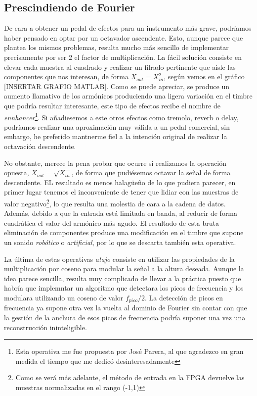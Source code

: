 \subsection{Prescindiendo de Fourier}
De cara a obtener un pedal de efectos para un instrumento más grave, podríamos haber pensado en optar por un octavador ascendente. Esto, aunque parece que plantea los mismos problemas, resulta mucho más sencillo de implementar precisamente por ser 2 el factor de multiplicación. La fácil solución consiste en elevar cada muestra al cuadrado y realizar un filrado pertinente que aisle las componentes que nos interesan, de forma $X_{out} = X_{in}^{2}$, según vemos en el gráfico [INSERTAR GRAFIO MATLAB]. Como se puede apreciar, se produce un aumento llamativo de los armónicos produciendo una ligera variación en el timbre que podría resultar interesante, este tipo de efectos recibe el nombre de \emph{ennhancer}\footnote{Esta operativa me fue propuesta por José Parera, al que agradezco en gran medida el tiempo que me dedicó desinteresadamente}. Si añadiesemos a este otros efectos como tremolo, reverb o delay, podríamos realizar una aproximación muy válida a un pedal comercial, sin embargo, he preferido mantnerme fiel a la intención original de realizar la octavación descendente.

No obstante, merece la pena probar que ocurre si realizamos la operación opuesta, $X_{out} = \sqrt{X_{in}}$, de forma que pudiésemos octavar la señal de forma descendente. EL resultado es menos halagüeño de lo que pudiera parecer, en primer lugar tenemos el inconveniente de tener que lidiar con las muestras de valor negativo\footnote{Como se verá más adelante, el método de entrada en la FPGA devuelve las muestras normalizadas en el rango (-1,1)}, lo que resulta una molestia de cara a la cadena de datos. Además, debido a que la entrada está limitada en banda, al reducir de forma cuadrática el valor del armónico más agudo. El resultado de esta bruta eliminación de componentes produce una modificación en el timbre que supone un sonido \emph{robótico} o \emph{artificial}, por lo que se descarta también esta operativa.

La última de estas operativas \emph{atajo} consiste en utilizar las propiedades de la multiplicación por coseno para modular la señal a la altura deseada. Aunque la idea parece sencilla, resulta muy complicado de llevar a la práctica puesto que habría que implemntar un algoritmo que detectara los picos de frecuencia y los modulara utilizando un coseno de valor $f_{pico}/2$. La detección de picos en frecuencia ya supone otra vez la vuelta al dominio de Fourier sin contar con que la gestión de la anchura de esos picos de frecuencia podría suponer una vez una reconstrucción ininteligible.

